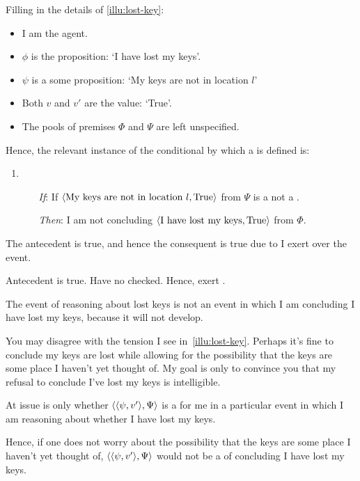 \begin{note}
  Filling in the details of \autoref{illu:lost-key}:
  \begin{itemize}[noitemsep]
  \item
    I am the agent.
  \item
    \(\phi\) is the proposition: `I have lost my keys'.
  \item
    \(\psi\) is a some proposition: `My keys are not in location \(l\)'
  \item
    Both \(v\) and \(v'\) are the value: `True'.
  \item
    The pools of premises \(\Phi\) and \(\Psi\) are left unspecified.
  \end{itemize}

  Hence, the relevant instance of the conditional by which a \requ{} is defined is:

  \begin{enumerate}[label=]
  \item
    \begin{itemize}
    \item[\emph{If}:]
      If \(\langle \text{My keys are not in location }l, \text{True} \rangle\) from \(\Psi\) is a not a \fc{}.
    \item[\emph{Then}:]
      I am not concluding \(\langle \text{I have lost my keys}, \text{True} \rangle\) from \(\Phi\).
    \end{itemize}
  \end{enumerate}

  The antecedent is true, and hence the consequent is true due to \ninf{} I exert over the event.

  Antecedent is true.
  Have no checked.
  Hence, exert \ninf{}.

  The event of reasoning about lost keys is not an event in which I am concluding I have lost my keys, because it will not develop.
\end{note}

\begin{note}
  You may disagree with the tension I see in~\autoref{illu:lost-key}.
  Perhaps it's fine to conclude my keys are lost while allowing for the possibility that the keys are some place I haven't yet thought of.
  My goal is only to convince you that my refusal to conclude I've lost my keys is intelligible.

  At issue is only whether \(\langle \langle \psi, v' \rangle, \Psi \rangle\) is a \requ{} for me in a particular event in which I am reasoning about whether I have lost my keys.

  Hence, if one does not worry about the possibility that the keys are some place I haven't yet thought of, \(\langle \langle \psi, v' \rangle, \Psi \rangle\) would not be a  of concluding I have lost my keys.
\end{note}


